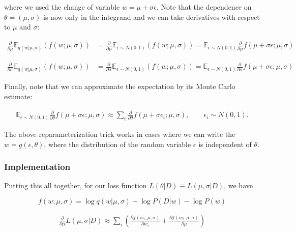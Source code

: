 \documentclass[11pt]{article}
\begin{document}
where we used the change of variable \(w = \mu + \sigma \epsilon\). Note
that the dependence on \(\theta = (\mu, \sigma)\) is now only in the
integrand and we can take derivatives with respect to \(\mu\) and
\(\sigma\):

\[
\begin{align}
\frac{\partial}{\partial \mu} \mathbb{E}_{q(w | \mu, \sigma)} (f(w; \mu, \sigma) ) &= \frac{\partial}{\partial \mu} \mathbb{E}_{\epsilon \sim N(0, 1)} (f \left( w; \mu, \sigma \right) ) = \mathbb{E}_{\epsilon \sim N(0, 1)} \frac{\partial}{\partial \mu} f \left( \mu + \sigma \epsilon; \mu, \sigma \right)
\end{align}
\]

\[
\begin{align}
\frac{\partial}{\partial \sigma} \mathbb{E}_{q(w | \mu, \sigma)} (f(w; \mu, \sigma) ) &= \frac{\partial}{\partial \sigma} \mathbb{E}_{\epsilon \sim N(0, 1)} (f \left( w; \mu, \sigma \right) ) = \mathbb{E}_{\epsilon \sim N(0, 1)} \frac{\partial}{\partial \sigma} f \left( \mu + \sigma \epsilon; \mu, \sigma \right)
\end{align}
\]

Finally, note that we can approximate the expectation by its Monte Carlo
estimate:

\[
\begin{align}
\mathbb{E}_{\epsilon \sim N(0, 1)}  \frac{\partial}{\partial \theta} f \left( \mu + \sigma \epsilon; \mu, \sigma \right) \approx \sum_{i}  \frac{\partial}{\partial \theta} f \left( \mu + \sigma \epsilon_i; \mu, \sigma \right),\qquad \epsilon_i \sim N(0, 1).
\end{align}
\]

The above reparameterization trick works in cases where we can write the
\(w = g(\epsilon, \theta)\), where the distribution of the random
variable \(\epsilon\) is independent of \(\theta\).

    \hypertarget{implementation}{%
\subsubsection{Implementation}\label{implementation}}

Putting this all together, for our loss function
\(L(\theta | D) \equiv L(\mu, \sigma | D)\), we have

\[
f(w; \mu, \sigma) = \log q(w | \mu, \sigma) - \log P(D | w) - \log P(w)
\]

\[
\begin{align}
\frac{\partial}{\partial \mu} L(\mu, \sigma | D) \approx \sum_{i} \left( \frac{\partial f(w_i; \mu, \sigma)}{\partial w_i} + \frac{\partial f(w_i; \mu, \sigma)}{\partial \mu} \right)
\end{align}
\]
\end{document}

